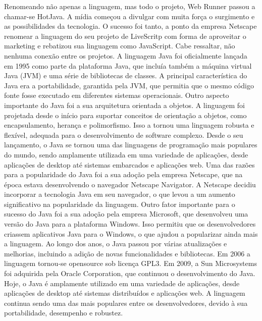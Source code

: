 \documentclass{article}
\begin{document}
Renomeando não apenas a linguagem, mas todo o projeto, Web Runner passou a chamar-se HotJava. A mídia começou a divulgar com muita força o surgimento e as possibilidades da tecnologia. O sucesso foi tanto, a ponto da empresa Netscape renomear a linguagem do seu projeto de LiveScritp com forma de aproveitar o marketing e rebatizou sua linguagem como JavaScript. Cabe ressaltar, não nenhuma conexão entre os projetos. \newline
A linguagem Java foi oficialmente lançada em 1995 como parte da plataforma Java, que incluía também a máquina virtual Java (JVM) e uma série de bibliotecas de classes. A principal característica do Java era a portabilidade, garantida pela JVM, que permitia que o mesmo código fonte fosse executado em diferentes sistemas operacionais. \newline
Outro aspecto importante do Java foi a sua arquitetura orientada a objetos. A linguagem foi projetada desde o início para suportar conceitos de orientação a objetos, como encapsulamento, herança e polimorfismo. Isso a tornou uma linguagem robusta e flexível, adequada para o desenvolvimento de software complexo. \newline
Desde o seu lançamento, o Java se tornou uma das linguagens de programação mais populares do mundo, sendo amplamente utilizada em uma variedade de aplicações, desde aplicações de desktop até sistemas embarcados e aplicações web. \newline
Uma das razões para a popularidade do Java foi a sua adoção pela empresa Netscape, que na época estava desenvolvendo o navegador Netscape Navigator. A Netscape decidiu incorporar a tecnologia Java em seu navegador, o que levou a um aumento significativo na popularidade da linguagem. \newline
Outro fator importante para o sucesso do Java foi a sua adoção pela empresa Microsoft, que desenvolveu uma versão do Java para a plataforma Windows. Isso permitiu que os desenvolvedores criassem aplicativos Java para o Windows, o que ajudou a popularizar ainda mais a linguagem. \newline
Ao longo dos anos, o Java passou por várias atualizações e melhorias, incluindo a adição de novas funcionalidades e bibliotecas. Em 2006 a linguagem tornou-se opensource sob licença GPL3. Em 2009, a Sun Microsystems foi adquirida pela Oracle Corporation, que continuou o desenvolvimento do Java. \newline
Hoje, o Java é amplamente utilizado em uma variedade de aplicações, desde aplicações de desktop até sistemas distribuídos e aplicações web. A linguagem continua sendo uma das mais populares entre os desenvolvedores, devido à sua portabilidade, desempenho e robustez.
\end{document}
